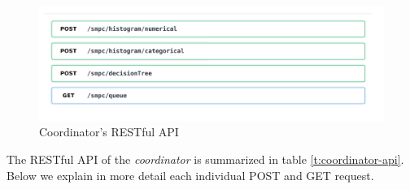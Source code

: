 \begin{figure}[H]
  \centering
  \includegraphics[page=1,width=\textwidth]{figures/api1_no_text.pdf}
  \caption{Coordinator's RESTful API}\label{f:outlook}
\end{figure}


The RESTful API of the \textit{coordinator} is summarized in table \ref{t:coordinator-api}.
Below we explain in more detail each individual POST and GET request.

